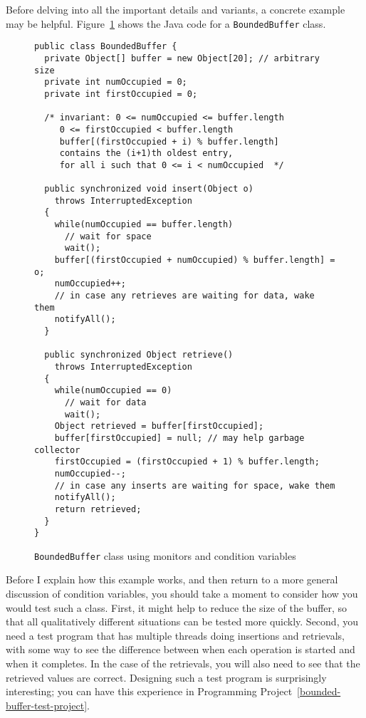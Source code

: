 Before delving into all the important details and variants,
a concrete example may be helpful.  Figure~\ref{BoundedBuffer.java} shows the Java
code for a \verb|BoundedBuffer| class.
\begin{figure}
\begin{verbatim}
public class BoundedBuffer {
  private Object[] buffer = new Object[20]; // arbitrary size
  private int numOccupied = 0;
  private int firstOccupied = 0;

  /* invariant: 0 <= numOccupied <= buffer.length
     0 <= firstOccupied < buffer.length
     buffer[(firstOccupied + i) % buffer.length]
     contains the (i+1)th oldest entry,
     for all i such that 0 <= i < numOccupied  */

  public synchronized void insert(Object o)
    throws InterruptedException
  {
    while(numOccupied == buffer.length)
      // wait for space
      wait();
    buffer[(firstOccupied + numOccupied) % buffer.length] = o;
    numOccupied++;
    // in case any retrieves are waiting for data, wake them
    notifyAll();
  }

  public synchronized Object retrieve()
    throws InterruptedException
  {
    while(numOccupied == 0)
      // wait for data
      wait();
    Object retrieved = buffer[firstOccupied];
    buffer[firstOccupied] = null; // may help garbage collector
    firstOccupied = (firstOccupied + 1) % buffer.length;
    numOccupied--;
    // in case any inserts are waiting for space, wake them
    notifyAll();
    return retrieved;
  }
}
\end{verbatim}
\caption{{\tt BoundedBuffer} class using monitors and condition variables}
\label{BoundedBuffer.java}
\end{figure}

Before I explain how this example works, and then return to a more
general discussion of condition variables, you should take a moment to
consider how you would test such a class.  First, it might help to
reduce the size of the buffer, so that all qualitatively different
situations can be tested more quickly.  Second, you need a test program
that has multiple threads doing insertions and retrievals, with some
way to see the difference between when each operation is started and
when it completes.  In the case of the retrievals, you will also need
to see that the retrieved values are correct.  Designing such a test
program is surprisingly interesting; you can have this experience in Programming Project~\ref{bounded-buffer-test-project}.

